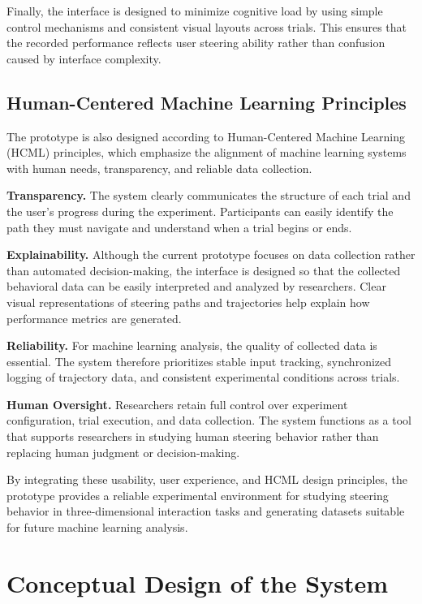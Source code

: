 \documentclass[sigconf]{acmart}
\begin{document}
Finally, the interface is designed to minimize cognitive load by using simple control mechanisms and consistent visual layouts across trials. This ensures that the recorded performance reflects user steering ability rather than confusion caused by interface complexity.

\subsection{Human-Centered Machine Learning Principles}

The prototype is also designed according to Human-Centered Machine Learning (HCML) principles, which emphasize the alignment of machine learning systems with human needs, transparency, and reliable data collection.

\textbf{Transparency.} The system clearly communicates the structure of each trial and the user's progress during the experiment. Participants can easily identify the path they must navigate and understand when a trial begins or ends.

\textbf{Explainability.} Although the current prototype focuses on data collection rather than automated decision-making, the interface is designed so that the collected behavioral data can be easily interpreted and analyzed by researchers. Clear visual representations of steering paths and trajectories help explain how performance metrics are generated.

\textbf{Reliability.} For machine learning analysis, the quality of collected data is essential. The system therefore prioritizes stable input tracking, synchronized logging of trajectory data, and consistent experimental conditions across trials.

\textbf{Human Oversight.} Researchers retain full control over experiment configuration, trial execution, and data collection. The system functions as a tool that supports researchers in studying human steering behavior rather than replacing human judgment or decision-making.

By integrating these usability, user experience, and HCML design principles, the prototype provides a reliable experimental environment for studying steering behavior in three-dimensional interaction tasks and generating datasets suitable for future machine learning analysis.
\section{Conceptual Design of the System}
\end{document}
